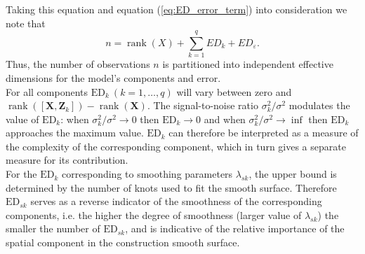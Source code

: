 Taking this equation and equation (\ref{eq:ED_error_term}) into consideration we note that
\begin{equation}
    n=\operatorname{rank}(X)+\sum_{k=1}^{q} E D_{k}+E D_{\varepsilon}
    \text{.}
\end{equation}
Thus, the number of observations $n$ is partitioned into independent effective dimensions for the model's components and error.\\
For all components $\mathrm{ED}_k \ (k=1,\ldots,q)$ will vary between zero and $\operatorname{rank}\left(\left[\mathbf{X}, \mathbf{Z}_{k}\right]\right)-\operatorname{rank}(\mathbf{X})$. The signal-to-noise ratio $\sigma_{k}^{2} / \sigma^{2}$ modulates the value of $\mathrm{ED}_k$: when $\sigma_{k}^{2} / \sigma^{2} \rightarrow 0$ then $\mathrm{ED}_{k} \rightarrow 0$ and when $\sigma_{k}^{2} / \sigma^{2} \rightarrow \inf$ then $\mathrm{ED}_k$ approaches the maximum value. $\mathrm{ED}_k$ can therefore be interpreted as a measure of the complexity of the corresponding component, which in turn gives a separate measure for its contribution.\\
For the $\mathrm{ED}_k$ corresponding to smoothing parameters $\lambda_{sk}$, the upper bound is determined by the number of knots used to fit the smooth surface. Therefore $\mathrm{ED}_{sk}$ serves as a reverse indicator of the smoothness of the corresponding components, i.e. the higher the degree of smoothness (larger value of $\lambda_{sk}$) the smaller the number of $\mathrm{ED}_{sk}$, and is indicative of the relative importance of the spatial component in the construction smooth surface.


